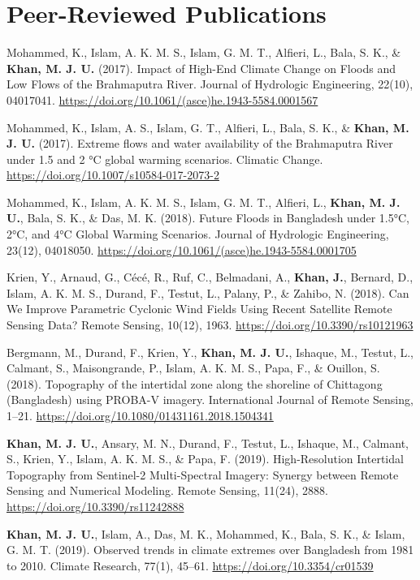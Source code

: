 \documentclass[11pt,a4paper,sans]{moderncv}
\begin{document}
\section{Peer-Reviewed Publications}
\begin{hangparas}{1cm}{1}
Mohammed, K., Islam, A. K. M. S., Islam, G. M. T., Alfieri, L., Bala, S. K., \& \textbf{Khan, M. J. U.} (2017). Impact of High-End Climate Change on Floods and Low Flows of the Brahmaputra River. Journal of Hydrologic Engineering, 22(10), 04017041. \url{https://doi.org/10.1061/(asce)he.1943-5584.0001567} 

Mohammed, K., Islam, A. S., Islam, G. T., Alfieri, L., Bala, S. K., \& \textbf{Khan, M. J. U.} (2017). Extreme flows and water availability of the Brahmaputra River under 1.5 and 2 °C global warming scenarios. Climatic Change. \url{https://doi.org/10.1007/s10584-017-2073-2} 

Mohammed, K., Islam, A. K. M. S., Islam, G. M. T., Alfieri, L., \textbf{Khan, M. J. U.}, Bala, S. K., \& Das, M. K. (2018). Future Floods in Bangladesh under 1.5°C, 2°C, and 4°C Global Warming Scenarios. Journal of Hydrologic Engineering, 23(12), 04018050. \url{https://doi.org/10.1061/(asce)he.1943-5584.0001705} 

Krien, Y., Arnaud, G., Cécé, R., Ruf, C., Belmadani, A., \textbf{Khan, J.}, Bernard, D., Islam, A. K. M. S., Durand, F., Testut, L., Palany, P., \& Zahibo, N. (2018). Can We Improve Parametric Cyclonic Wind Fields Using Recent Satellite Remote Sensing Data? Remote Sensing, 10(12), 1963. \url{https://doi.org/10.3390/rs10121963} 

Bergmann, M., Durand, F., Krien, Y., \textbf{Khan, M. J. U.}, Ishaque, M., Testut, L., Calmant, S., Maisongrande, P., Islam, A. K. M. S., Papa, F., \& Ouillon, S. (2018). Topography of the intertidal zone along the shoreline of Chittagong (Bangladesh) using PROBA-V imagery. International Journal of Remote Sensing, 1–21. \url{https://doi.org/10.1080/01431161.2018.1504341} 

\textbf{Khan, M. J. U.}, Ansary, M. N., Durand, F., Testut, L., Ishaque, M., Calmant, S., Krien, Y., Islam, A. K. M. S., \& Papa, F. (2019). High-Resolution Intertidal Topography from Sentinel-2 Multi-Spectral Imagery: Synergy between Remote Sensing and Numerical Modeling. Remote Sensing, 11(24), 2888. \url{https://doi.org/10.3390/rs11242888} 

\textbf{Khan, M. J. U.}, Islam, A., Das, M. K., Mohammed, K., Bala, S. K., \& Islam, G. M. T. (2019). Observed trends in climate extremes over Bangladesh from 1981 to 2010. Climate Research, 77(1), 45–61. \url{https://doi.org/10.3354/cr01539} 


\end{hangparas}
\end{document}
